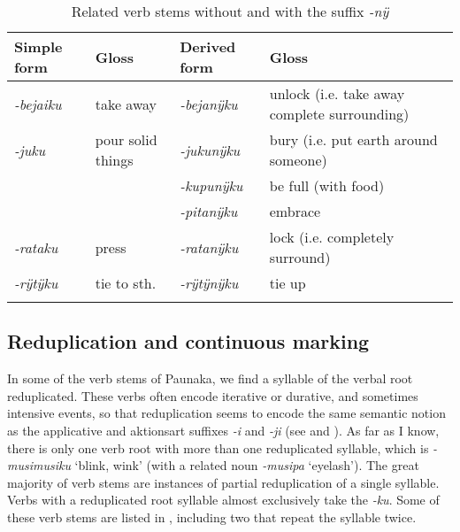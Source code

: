 \begin{table}
\caption{Related verb stems without and with the suffix \textit{-nÿ}}

\begin{tabularx}{\textwidth}{lllQ}
\lsptoprule
Simple form & Gloss & Derived form & Gloss \\
\midrule
\textit{-bejaiku} & take away & \textit{-bejanÿku} & unlock (i.e. take away complete surrounding)\\
\textit{-juku} & pour solid things & \textit{-jukunÿku} & bury (i.e. put earth around someone)\\
&  & \textit{-kupunÿku} & be full (with food)\\
 &  & \textit{-pitanÿku} & embrace\\
\textit{-rataku} & press & \textit{-ratanÿku} & lock (i.e. completely surround) \\
\textit{-rÿtÿku} & tie to sth. & \textit{-rÿtÿnÿku} & tie up\\
\lspbottomrule
\end{tabularx}

\label{table:DIR-nÿ-deriv}
\end{table}

\subsection{Reduplication and continuous marking}\label{sec:ActiveVerbs_RDPL}

In some of the verb stems of Paunaka, we find a syllable of the verbal root reduplicated. These verbs often encode iterative or durative, and sometimes intensive events, so that reduplication seems to encode the same semantic notion as the applicative and aktionsart  suffixes \textit{-i} and \textit{-ji} (see  and ). As far as I know, there is only one verb root with more than one reduplicated syllable, which is \textit{-musimusiku} ‘blink, wink’ (with a related noun \textit{-musipa} ‘eyelash’). The great majority of verb stems are instances of partial reduplication of a single syllable.
Verbs with a reduplicated root syllable almost exclusively take the  \textit{-ku}. Some of these verb stems are listed in , including two that repeat the syllable twice.


